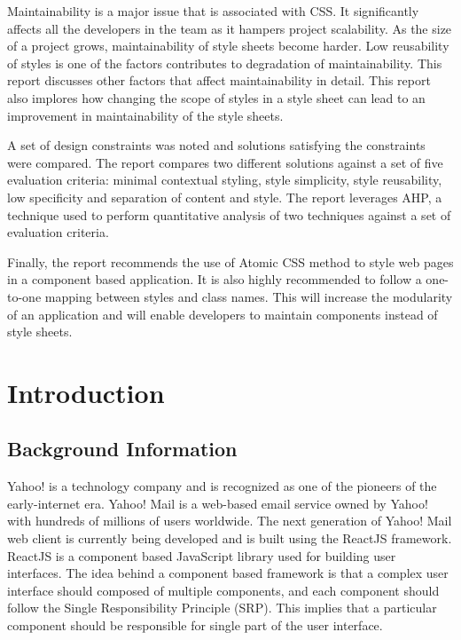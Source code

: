 \documentclass[12pt]{article}
\begin{document}
Maintainability is a major issue that is associated with CSS. It significantly affects all the developers in the team as it hampers project scalability. As the size of a project grows, maintainability of style sheets become harder. Low reusability of styles is one of the factors contributes to degradation of maintainability. This report discusses other factors that affect maintainability in detail. This report also implores how changing the scope of styles in a style sheet can lead to an improvement in maintainability of the style sheets.

A set of design constraints was noted and solutions satisfying the constraints were compared. The report compares two different solutions against a set of five evaluation criteria: minimal contextual styling, style simplicity, style reusability, low specificity and separation of content and style. The report leverages AHP, a technique used to perform quantitative analysis of two techniques against a set of evaluation criteria. 

Finally, the report recommends the use of Atomic CSS method to style web pages in a component based application. It is also highly recommended to follow a one-to-one mapping between styles and class names. This will increase the modularity of an application and will enable developers to maintain components instead of style sheets.

\newpage

\toc
\lof
\lot

\section{Introduction}
\subsection{Background Information}

Yahoo! is a technology company and is recognized as one of the pioneers of the early-internet era. Yahoo! Mail is a web-based email service owned by Yahoo! with hundreds of millions of users worldwide. The next generation of Yahoo! Mail web client is currently being developed and is built using the ReactJS framework. ReactJS is a component based JavaScript library used for building user interfaces. The idea behind a component based framework is that a complex user interface should composed of multiple components, and each component should follow the Single Responsibility Principle (SRP). This implies that a particular component should be responsible for single part of the user interface.
\end{document}
